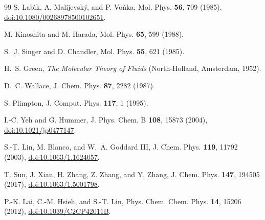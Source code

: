 \documentclass[aps,pre,twocolumn,superscriptaddress,floatfix]{revtex4-2}
\begin{document}
\begin{thebibliography}{99}
S. Lab{\'\i}k, A. Malijevsk{\'y}, and P. Vo{\v n}ka,
Mol. Phys. \textbf{56}, 709 (1985),
\href{https://doi.org/10.1080/00268978500102651}{doi:10.1080/00268978500102651}.

M. Kinoshita and M. Harada,
Mol. Phys. \textbf{65}, 599 (1988).

S.~J. Singer and D. Chandler,
Mol. Phys. \textbf{55}, 621 (1985).

H.~S. Green,
\textit{The Molecular Theory of Fluids}
(North-Holland, Amsterdam, 1952).

D.~C. Wallace,
J. Chem. Phys. \textbf{87}, 2282 (1987).

S. Plimpton,
J. Comput. Phys. \textbf{117}, 1 (1995).

I.-C. Yeh and G. Hummer,
J. Phys. Chem. B \textbf{108}, 15873 (2004),
\href{https://doi.org/10.1021/jp0477147}{doi:10.1021/jp0477147}.

S.-T. Lin, M. Blanco, and W.~A. Goddard III,
J. Chem. Phys. \textbf{119}, 11792 (2003),
\href{https://doi.org/10.1063/1.1624057}{doi:10.1063/1.1624057}.

T. Sun, J. Xian, H. Zhang, Z. Zhang, and Y. Zhang,
J. Chem. Phys. \textbf{147}, 194505 (2017),
\href{https://doi.org/10.1063/1.5001798}{doi:10.1063/1.5001798}.

P.-K. Lai, C.-M. Hsieh, and S.-T. Lin,
Phys. Chem. Chem. Phys. \textbf{14}, 15206 (2012),
\href{https://doi.org/10.1039/C2CP42011B}{doi:10.1039/C2CP42011B}.

\end{thebibliography}
\end{document}

